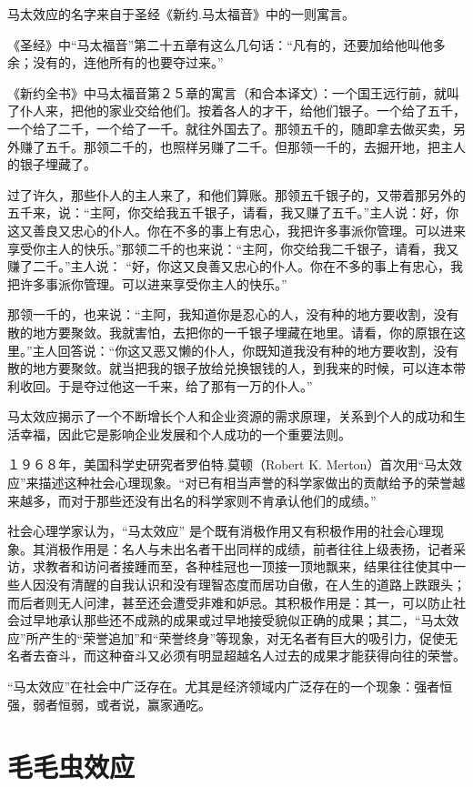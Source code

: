 \documentclass[11pt]{ctexart}
\begin{document}
马太效应的名字来自于圣经《新约.马太福音》中的一则寓言。

《圣经》中“马太福音”第二十五章有这么几句话：“凡有的，还要加给他叫他多余；没有的，连他所有的也要夺过来。”

《新约全书》中马太福音第２５章的寓言（和合本译文）：一个国王远行前，就叫了仆人来，把他的家业交给他们。按着各人的才干，给他们银子。一个给了五千，一个给了二千，一个给了一千。就往外国去了。那领五千的，随即拿去做买卖，另外赚了五千。那领二千的，也照样另赚了二千。但那领一千的，去掘开地，把主人的银子埋藏了。

过了许久，那些仆人的主人来了，和他们算账。那领五千银子的，又带着那另外的五千来，说：“主阿，你交给我五千银子，请看，我又赚了五千。”主人说：好，你这又善良又忠心的仆人。你在不多的事上有忠心，我把许多事派你管理。可以进来享受你主人的快乐。”那领二千的也来说：“主阿，你交给我二千银子，请看，我又赚了二千。”主人说： “好，你这又良善又忠心的仆人。你在不多的事上有忠心，我把许多事派你管理。可以进来享受你主人的快乐。”

那领一千的，也来说：“主阿，我知道你是忍心的人，没有种的地方要收割，没有散的地方要聚敛。我就害怕，去把你的一千银子埋藏在地里。请看，你的原银在这里。”主人回答说：“你这又恶又懒的仆人，你既知道我没有种的地方要收割，没有散的地方要聚敛。就当把我的银子放给兑换银钱的人，到我来的时候，可以连本带利收回。于是夺过他这一千来，给了那有一万的仆人。”

马太效应揭示了一个不断增长个人和企业资源的需求原理，关系到个人的成功和生活幸福，因此它是影响企业发展和个人成功的一个重要法则。

１９６８年，美国科学史研究者罗伯特.莫顿（Robert K. Merton）首次用“马太效应”来描述这种社会心理现象。“对已有相当声誉的科学家做出的贡献给予的荣誉越来越多，而对于那些还没有出名的科学家则不肯承认他们的成绩。”

社会心理学家认为，“马太效应” 是个既有消极作用又有积极作用的社会心理现象。其消极作用是：名人与未出名者干出同样的成绩，前者往往上级表扬，记者采访，求教者和访问者接踵而至，各种桂冠也一顶接一顶地飘来，结果往往使其中一些人因没有清醒的自我认识和没有理智态度而居功自傲，在人生的道路上跌跟头；而后者则无人问津，甚至还会遭受非难和妒忌。其积极作用是：其一，可以防止社会过早地承认那些还不成熟的成果或过早地接受貌似正确的成果；其二，“马太效应”所产生的“荣誉追加”和“荣誉终身”等现象，对无名者有巨大的吸引力，促使无名者去奋斗，而这种奋斗又必须有明显超越名人过去的成果才能获得向往的荣誉。

“马太效应”在社会中广泛存在。尤其是经济领域内广泛存在的一个现象：强者恒强，弱者恒弱，或者说，赢家通吃。
\section{毛毛虫效应}
\label{sec-65}
\end{document}
